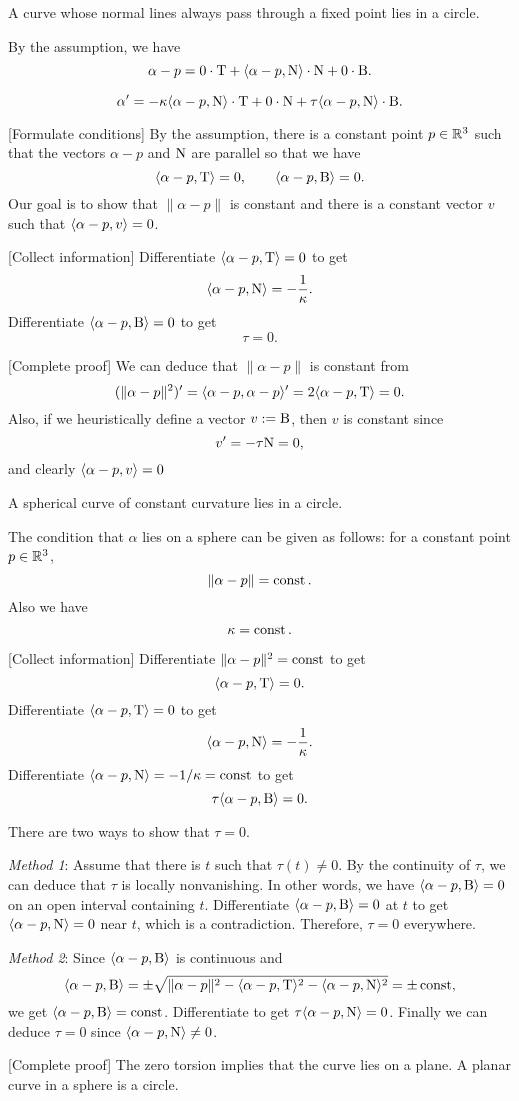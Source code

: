 \documentclass{../../large}
\renewcommand{\a}{\alpha}
\begin{document}
\begin{prb}
A curve whose normal lines always pass through a fixed point lies in a circle.
\end{prb}
\begin{sol}
By the assumption, we have
\[\a-p=0\cdot\rT+\<\a-p,\rN\>\cdot\rN+0\cdot\rB.\]

\[\a'=-\kappa\<\a-p,\rN\>\cdot\rT+0\cdot\rN+\tau\<\a-p,\rN\>\cdot\rB.\]

[Formulate conditions]
By the assumption, there is a constant point $p\in\mathbb{R}^3$ such that the vectors $\a-p$ and $\mathrm{N}$ are parallel so that we have
\[\<\a-p,\rT\>=0,\qquad\<\a-p,\rB\>=0.\]
Our goal is to show that $\|\a-p\|$ is constant and there is a constant vector $v$ such that $\<\a-p,v\>=0$.

[Collect information]
Differentiate $\<\a-p,\rT\>=0$ to get
\[\<\a-p,\rN\>=-\frac1\kappa.\]
Differentiate $\<\a-p,\rB\>=0$ to get
\[\tau=0.\]

[Complete proof]
We can deduce that $\|\a-p\|$ is constant from
\[(\|\a-p\|^2)'=\<\a-p,\a-p\>'=2\<\a-p,\rT\>=0.\]
Also, if we heuristically define a vector $v:=\mathrm{B}$, then $v$ is constant since
\[v'=-\tau\mathrm{N}=0,\]
and clearly $\<\a-p,v\>=0$
\end{sol}

\begin{prb}
A spherical curve of constant curvature lies in a circle.
\end{prb}
\begin{sol}
The condition that $\a$ lies on a sphere can be given as follows: for a constant point $p\in\mathbb{R}^3$,
\[\|\a-p\|=\const.\]
Also we have
\[\kappa=\operatorname{const}.\]

[Collect information]
Differentiate $\|\a-p\|^2=\const$ to get
\[\<\a-p,\rT\>=0.\]
Differentiate $\<\a-p,\rT\>=0$ to get
\[\<\a-p,\rN\>=-\frac1\kappa.\]
Differentiate $\<\a-p,\rN\>=-1/\kappa=\const$ to get
\[\tau\<\a-p,\rB\>=0.\]

There are two ways to show that $\tau=0$.

\emph{Method 1}:
Assume that there is $t$ such that $\tau(t)\ne0$.
By the continuity of $\tau$, we can deduce that $\tau$ is locally nonvanishing.
In other words, we have $\<\a-p,\rB\>=0$ on an open interval containing $t$.
Differentiate $\<\a-p,\rB\>=0$ at $t$ to get $\<\a-p,\rN\>=0$ near $t$, which is a contradiction.
Therefore, $\tau=0$ everywhere.

\emph{Method 2}:
Since $\<\a-p,\rB\>$ is continuous and
\[\<\a-p,\rB\>=\pm\sqrt{\|\a-p\|^2-\<\a-p,\rT\>^2-\<\a-p,\rN\>^2}=\pm\const,\]
we get $\<\a-p,\rB\>=\const$.
Differentiate to get $\tau\<\a-p,\rN\>=0$.
Finally we can deduce $\tau=0$ since $\<\a-p,\rN\>\ne0$.

[Complete proof]
The zero torsion implies that the curve lies on a plane.
A planar curve in a sphere is a circle.
\end{sol}
\end{document}
